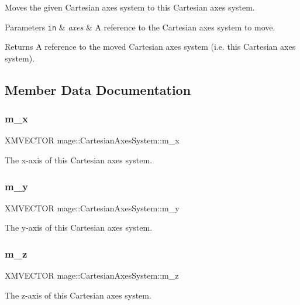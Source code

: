 Moves the given Cartesian axes system to this Cartesian axes system.


\begin{DoxyParams}[1]{Parameters}
\mbox{\tt in}  & {\em axes} & A reference to the Cartesian axes system to move. \\
\hline
\end{DoxyParams}
\begin{DoxyReturn}{Returns}
A reference to the moved Cartesian axes system (i.\+e. this Cartesian axes system). 
\end{DoxyReturn}


\subsection{Member Data Documentation}
\hypertarget{structmage_1_1_cartesian_axes_system_aa840c10ca92782e8c87c1ab53f0b86e9}{}\label{structmage_1_1_cartesian_axes_system_aa840c10ca92782e8c87c1ab53f0b86e9} 
\subsubsection{\texorpdfstring{m\+\_\+x}{m\_x}}
{\footnotesize\ttfamily X\+M\+V\+E\+C\+T\+OR mage\+::\+Cartesian\+Axes\+System\+::m\+\_\+x\hspace{0.3cm}{\ttfamily [private]}}

The x-\/axis of this Cartesian axes system. \hypertarget{structmage_1_1_cartesian_axes_system_a2cc6bc4fe185791a877e1418e85d6b47}{}\label{structmage_1_1_cartesian_axes_system_a2cc6bc4fe185791a877e1418e85d6b47} 
\subsubsection{\texorpdfstring{m\+\_\+y}{m\_y}}
{\footnotesize\ttfamily X\+M\+V\+E\+C\+T\+OR mage\+::\+Cartesian\+Axes\+System\+::m\+\_\+y\hspace{0.3cm}{\ttfamily [private]}}

The y-\/axis of this Cartesian axes system. \hypertarget{structmage_1_1_cartesian_axes_system_abc733e5f82104391b0b352d263313d64}{}\label{structmage_1_1_cartesian_axes_system_abc733e5f82104391b0b352d263313d64} 
\subsubsection{\texorpdfstring{m\+\_\+z}{m\_z}}
{\footnotesize\ttfamily X\+M\+V\+E\+C\+T\+OR mage\+::\+Cartesian\+Axes\+System\+::m\+\_\+z\hspace{0.3cm}{\ttfamily [private]}}

The z-\/axis of this Cartesian axes system. 
